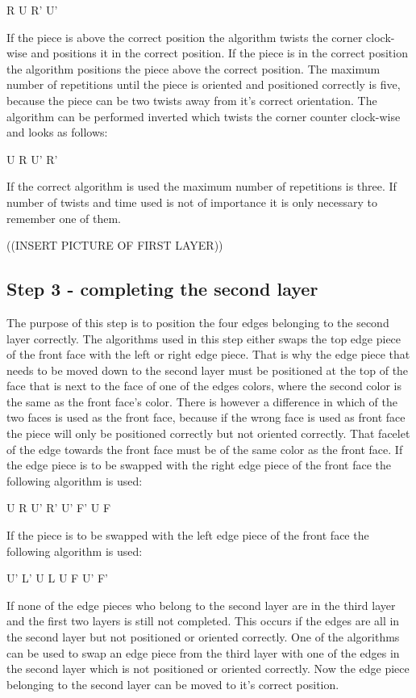 R U R' U'

If the piece is above the correct position the algorithm twists the corner clock-wise and positions it in the correct position. If the piece is in the correct position the algorithm positions the piece above the correct position. The maximum number of repetitions until the piece is oriented and positioned correctly is five, because the piece can be two twists away from it's correct orientation. 
The algorithm can be performed inverted which twists the corner counter clock-wise and looks as follows:

U R U' R'

If the correct algorithm is used the maximum number of repetitions is three. If number of twists and time used is not of importance it is only necessary to remember one of them.

((INSERT PICTURE OF FIRST LAYER))

\subsection{Step 3 - completing the second layer}
The purpose of this step is to position the four edges belonging to the second layer correctly. The algorithms used in this step either swaps the top edge piece of the front face with the left or right edge piece. That is why the edge piece that needs to be moved down to the second layer must be positioned at the top of the face that is next to the face of one of the edges colors, where the second color is the same as the front face's color. There is however a difference in which of the two faces is used as the front face, because if the wrong face is used as front face the piece will only be positioned correctly but not oriented correctly. That facelet of the edge towards the front face must be of the same color as the front face. If the edge piece is to be swapped with the right edge piece of the front face the following algorithm is used:

U R U' R' U' F' U F

If the piece is to be swapped with the left edge piece of the front face the following algorithm is used:

U' L' U L U F U' F'

If none of the edge pieces who belong to the second layer are in the third layer and the first two layers is still not completed. This occurs if the edges are all in the second layer but not positioned or oriented correctly. One of the algorithms can be used to swap an edge piece from the third layer with one of the edges in the second layer which is not positioned or oriented correctly. Now the edge piece belonging to the second layer can be moved to it's correct position.

